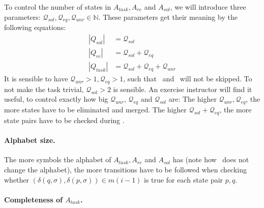 To control the number of states in $A_{task}, A_{re}$ and $A_{sol}$, we will introduce three parameters: $\mathcal{Q}_{sol}, \mathcal{Q}_{eq}, \mathcal{Q}_{unr} \in \mathbb{N}$. These parameters get their meaning by the following equations:
\begin{align*}
    |Q_{sol}| &= \mathcal{Q}_{sol} \\
    |Q_{re}| &= \mathcal{Q}_{sol} + \mathcal{Q}_{eq} \\
    |Q_{task}| &= \mathcal{Q}_{sol} + \mathcal{Q}_{eq} + \mathcal{Q}_{unr}
\end{align*}
It is sensible to have $\mathcal{Q}_{unr} > 1, \mathcal{Q}_{eq} > 1$, such that \RemUnr\ and \RemEq\ will not be skipped. To not make the task trivial, $\mathcal{Q}_{sol} > 2$ is sensible. An exercise instructor will find it useful, to control exactly how big $\mathcal{Q}_{unr}$, $\mathcal{Q}_{eq}$ and $\mathcal{Q}_{sol}$ are: The higher $\mathcal{Q}_{unr}, \mathcal{Q}_{eq}$, the more states have to be eliminated and merged. The higher $\mathcal{Q}_{sol} + \mathcal{Q}_{eq}$, the more state pairs have to be checked during \CompDist.


\paragraph*{Alphabet size.}

The more symbols the alphabet of $A_{task}, A_{re}$ and $A_{sol}$ has (note how \MinAlg\ does not change the alphabet), the more transitions have to be followed when checking whether $(\delta(q,\sigma),\delta(p,\sigma))\in m(i-1)$ is true for each state pair $p,q$.

\paragraph*{Completeness of $A_{task}$.}

